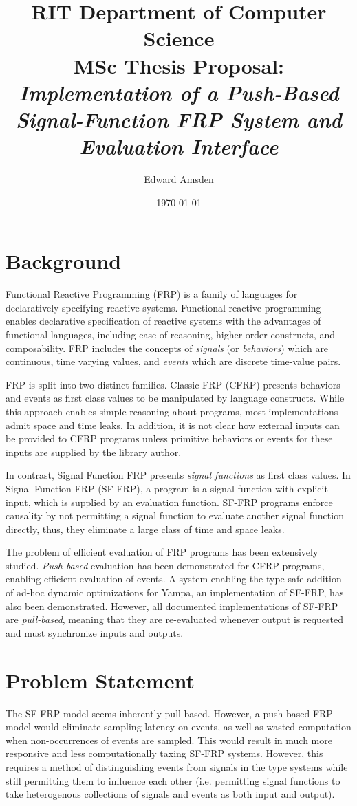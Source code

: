 \documentclass[11pt]{artikel3}
\title{RIT Department of Computer Science\\MSc Thesis Proposal:\\\emph{Implementation of a Push-Based Signal-Function FRP System and Evaluation Interface}}
\author{Edward Amsden}
\date{\today}
\begin{document}
\maketitle

\section{Background}
Functional Reactive Programming (FRP) is a family of languages for
declaratively specifying reactive systems. Functional reactive
programming enables declarative specification of reactive systems with
the advantages of functional languages, including ease of reasoning,
higher-order constructs, and composability. FRP includes the concepts
of {\em signals} (or {\em behaviors}) which are continuous, time
varying values, and {\em events} which are discrete time-value pairs.

FRP is split into two distinct families. Classic FRP (CFRP) presents
behaviors and events as first class values to be manipulated by
language constructs. While this approach enables simple reasoning
about programs, most implementations admit space and time leaks. In
addition, it is not clear how external inputs can be provided to
CFRP programs unless primitive behaviors or events for these
inputs are supplied by the library author.

In contrast, Signal Function FRP presents {\em signal functions} as
first class values. In Signal Function FRP (SF-FRP), a program is a
signal function with explicit input, which is supplied by an
evaluation function. SF-FRP programs enforce causality by not
permitting a signal function to evaluate another signal function
directly, thus, they eliminate a large class of time and space leaks.

The problem of efficient evaluation of FRP programs has been
extensively studied. {\em Push-based} evaluation has been demonstrated
for CFRP programs, enabling efficient evaluation of events. A system
enabling the type-safe addition of ad-hoc dynamic optimizations for
Yampa, an implementation of SF-FRP, has also been
demonstrated. However, all documented implementations of SF-FRP are
{\em pull-based}, meaning that they are re-evaluated whenever output
is requested and must synchronize inputs and outputs.

\section{Problem Statement}
The SF-FRP model seems inherently pull-based. However, a push-based
FRP model would eliminate sampling latency on events, as well as
wasted computation when non-occurrences of events are sampled. This
would result in much more responsive and less computationally taxing
SF-FRP systems. However, this requires a method of distinguishing
events from signals in the type systems while still permitting them to
influence each other (i.e. permitting signal functions to take
heterogenous collections of signals and events as both input and output).
\end{document}
